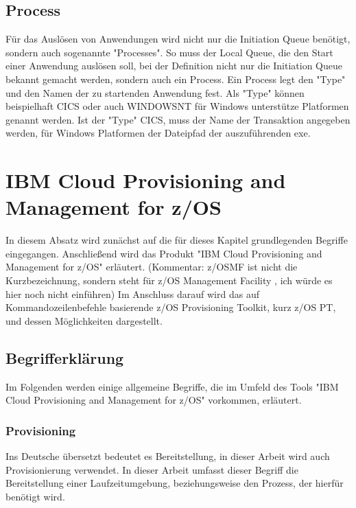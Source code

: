 \subsection{Process}
Für das Auslösen von Anwendungen wird nicht nur die Initiation Queue benötigt, sondern auch sogenannte "Processes".
So muss der Local Queue, die den Start einer Anwendung auslösen soll, bei der Definition nicht nur die Initiation Queue bekannt gemacht werden, sondern auch ein Process.
Ein Process legt den "Type" und den Namen der zu startenden Anwendung fest.
Als "Type" können beispielhaft CICS oder auch WINDOWSNT für Windows unterstütze Platformen genannt werden.
Ist der "Type" CICS,  muss der Name der Transaktion angegeben werden, für Windows Platformen der Dateipfad der auszuführenden exe.
\cite{Aranha.2013}

\section{IBM Cloud Provisioning and Management for z/OS}\label{sec:zosmf}
In diesem Absatz wird zunächst auf die für dieses Kapitel grundlegenden Begriffe eingegangen.
Anschließend wird das Produkt "IBM Cloud Provisioning and Management for z/OS" erläutert. (Kommentar: z/OSMF ist nicht die Kurzbezeichnung, sondern steht für z/OS Management Facility , ich würde es hier noch nicht einführen)
Im Anschluss darauf wird das auf Kommandozeilenbefehle basierende z/OS Provisioning Toolkit, kurz z/OS PT, und dessen Möglichkeiten dargestellt.

\subsection{Begrifferklärung}
Im Folgenden werden einige allgemeine Begriffe, die im Umfeld des Tools "IBM Cloud Provisioning and Management for z/OS" vorkommen, erläutert.

\subsubsection{Provisioning}
Ins Deutsche übersetzt bedeutet es Bereitstellung, in dieser Arbeit wird auch Provisionierung verwendet.
In dieser Arbeit umfasst dieser Begriff die Bereitstellung einer Laufzeitumgebung, beziehungsweise den Prozess, der hierfür benötigt wird.

